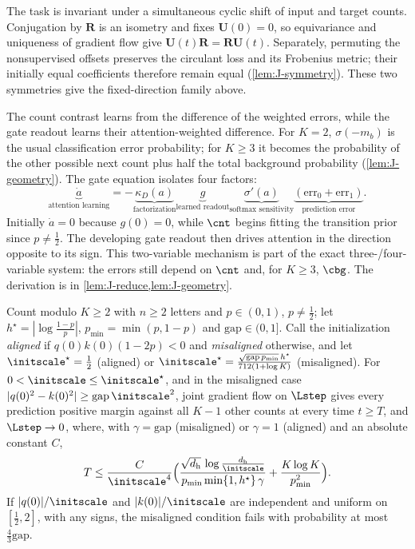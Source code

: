 The task is invariant under a simultaneous cyclic shift of input and target counts. Conjugation by $\mathbf R$ is an isometry
and fixes $\mathbf U(0)=0$, so equivariance and uniqueness of gradient flow give $\mathbf U(t)\mathbf R=\mathbf R\mathbf U(t)$.
Separately, permuting the nonsupervised offsets preserves the circulant loss and its Frobenius metric; their initially equal
coefficients therefore remain equal (\cref{lem:J-symmetry}). These two symmetries give the fixed-direction family above.

The count contrast learns from the difference of the weighted errors, while the gate readout learns their attention-weighted
difference. For $K=2$, $\sigma(-m_b)$ is the usual classification error probability; for $K\ge3$ it becomes the probability of the
other possible next count plus half the total background probability (\cref{lem:J-geometry}). The gate equation isolates four factors:
\[
 \boxed{\underbrace{\dot a}_{\text{attention learning}}
 =-\underbrace{\kappa_D(a)}_{\text{factorization}}
 \underbrace{g}_{\text{learned readout}}
 \underbrace{\sigma'(a)}_{\text{softmax sensitivity}}
 \underbrace{(\mathrm{err}_0+\mathrm{err}_1)}_{\text{prediction error}}.}
\]
Initially $\dot a=0$ because $g(0)=0$, while $\cnt$ begins fitting the transition prior since $p\ne\frac12$. The developing gate
readout then drives attention in the direction opposite to its sign. This two-variable mechanism is part of the exact
three-/four-variable system: the errors still depend on $\cnt$ and, for $K\ge3$, $\cbg$. The derivation is in \cref{lem:J-reduce,lem:J-geometry}.

\begin{theorem}
\label{thm:joint}
Count modulo $K\ge2$ with $n\ge2$ letters and $p\in(0,1)$, $p\neq\tfrac{1}{2}$; let $h^\star=|\log\tfrac{1-p}{p}|$, $p_{\min}=\min(p,1-p)$ and
$\mathrm{gap}\in(0,1]$. Call the initialization \emph{aligned} if $q(0)k(0)(1-2p)<0$ and \emph{misaligned} otherwise, and let
$\initscale^\star=\tfrac{1}{2}$ (aligned) or $\initscale^\star=\frac{\sqrt{\mathrm{gap}\,p_{\min}}\,h^\star}{712(1+\log K)}$ (misaligned).
For $0<\initscale\le\initscale^\star$, and in the misaligned case $|q(0)^2-k(0)^2|\ge\mathrm{gap}\,\initscale^2$, joint gradient flow on $\Lstep$ gives
every prediction positive margin against all $K-1$ other counts at every time $t\ge T$, and $\Lstep\to0$, where, with $\gamma=\mathrm{gap}$
(misaligned) or $\gamma=1$ (aligned) and an absolute constant $C$,
\[
 T\le\frac{C}{\initscale^4}\Bigl(\frac{\sqrt{d_{\mathrm h}}\,\log\frac{d_{\mathrm h}}{\initscale}}{p_{\min}\min\{1,h^\star\}\,\gamma}+\frac{K\log K}{p_{\min}^2}\Bigr).
\]
If $|q(0)|/\initscale$ and $|k(0)|/\initscale$ are independent and uniform on $[\tfrac{1}{2},2]$, with any signs, the misaligned condition fails with
probability at most $\tfrac{4}{3}\mathrm{gap}$.
\end{theorem}

